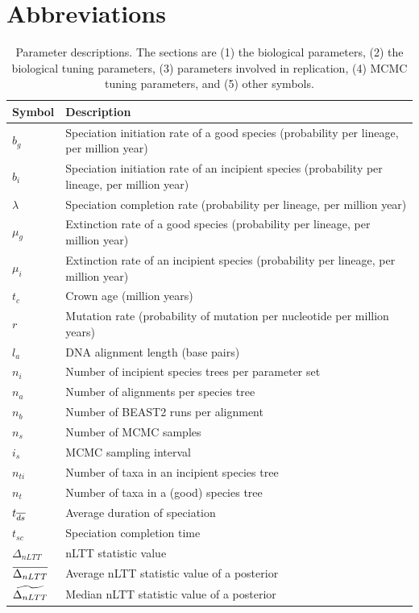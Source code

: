 \documentclass{article}
\begin{document}
\section{Abbreviations}

\begin{table}
  \centering 
  \begin{tabular}{l l}
    \hline
    Symbol & Description \\
    \hline
    \hline
    $b_g$ & Speciation initiation rate of a good species (probability per lineage, per million year) \\
    $b_i$ & Speciation initiation rate of an incipient species (probability per lineage, per million year) \\
    $\lambda$ & Speciation completion rate (probability per lineage, per million year) \\
    $\mu_g$ & Extinction rate of a good species (probability per lineage, per million year) \\
    $\mu_i$ & Extinction rate of an incipient species (probability per lineage, per million year) \\
    \hline
    $t_c$ & Crown age (million years) \\
    $r$ & Mutation rate (probability of mutation per nucleotide per million years) \\
    $l_a$ & DNA alignment length (base pairs) \\
    \hline
    $n_i$ & Number of incipient species trees per parameter set \\
    $n_a$ & Number of alignments per species tree \\
    $n_b$ & Number of BEAST2 runs per alignment \\
    \hline
    $n_s$ & Number of MCMC samples \\
    $i_s$ & MCMC sampling interval \\
    \hline
    $n_{ti}$ & Number of taxa in an incipient species tree \\
    $n_{t}$ & Number of taxa in a (good) species tree \\
    $t_{\overline{ds}}$ & Average duration of speciation \\
    $t_{sc}$ & Speciation completion time \\
    $\Delta_{nLTT}$ & nLTT statistic value \\
    $\overline{\Delta_{nLTT}}$ & Average nLTT statistic value of a posterior \\
    $\widetilde{\Delta_{nLTT}}$ & Median nLTT statistic value of a posterior \\
    \hline
  \end{tabular}
  \caption{
    Parameter descriptions. The sections are (1) the biological parameters, (2) the
    biological tuning parameters, (3) parameters involved in replication, (4) MCMC
    tuning parameters, and (5) other symbols.
  }
  \label{table:parameter_descriptions}
\end{table}
\end{document}
